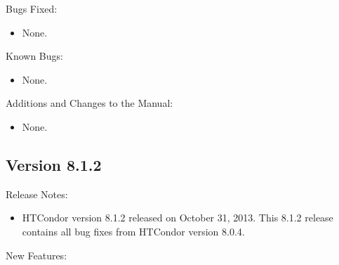 \noindent Bugs Fixed:

\begin{itemize}

\item None.

\end{itemize}

\noindent Known Bugs:

\begin{itemize}

\item None.

\end{itemize}

\noindent Additions and Changes to the Manual:

\begin{itemize}

\item None.

\end{itemize}


\subsection*{\label{sec:New-8-1-2}Version 8.1.2}

\noindent Release Notes:

\begin{itemize}

\item HTCondor version 8.1.2 released on October 31, 2013.
This 8.1.2 release contains all bug fixes from HTCondor version 8.0.4.

\end{itemize}


\noindent New Features:

